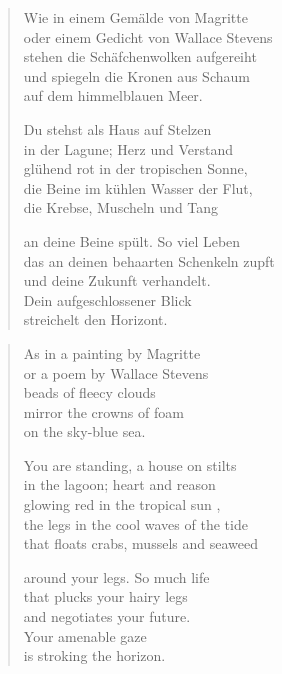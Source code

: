 
\cleartoverso


\begin{verse}

Wie in einem Gemälde von Magritte\\
oder einem Gedicht von Wallace Stevens\\
stehen die Schäfchenwolken aufgereiht\\
und spiegeln die Kronen aus Schaum\\
auf dem himmelblauen Meer.

Du stehst als Haus auf Stelzen\\
in der Lagune; Herz und Verstand\\
glühend rot in der tropischen Sonne,\\
die Beine im kühlen Wasser der Flut,\\
die Krebse, Muscheln und Tang

an deine Beine spült. So viel Leben\\
das an deinen behaarten Schenkeln zupft\\
und deine Zukunft verhandelt.\\
Dein aufgeschlossener Blick\\
streichelt den Horizont.

\end{verse}

\clearpage


\begin{verse}

As in a painting by Magritte\\
or a poem by Wallace Stevens\\
beads of fleecy clouds\\
mirror the crowns of foam\\
on the sky-blue sea.

You are standing, a house on stilts\\
in the lagoon; heart and reason\\
glowing red in the tropical sun ,\\
the legs in the cool waves of the tide\\
that floats crabs, mussels and seaweed

around your legs. So much life\\
that plucks your hairy legs\\
and negotiates your future.\\
Your amenable gaze\\
is stroking the horizon.

\end{verse}
